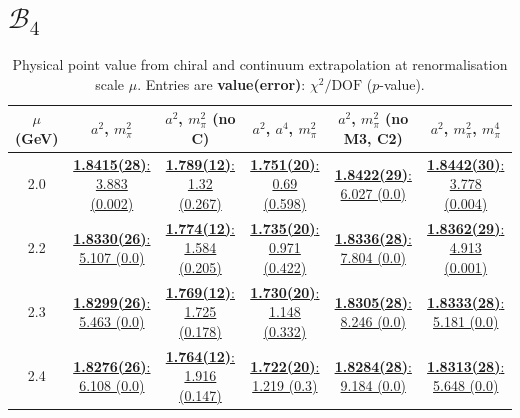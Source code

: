 \documentclass[12pt]{extarticle}
\begin{document}
\section{$\mathcal{B}_4$}
\begin{table}[h!]
\begin{center}
\begin{tabular}{|c|c|c|c|c|c|}
\hline
$\mu$ (GeV) & $a^2$, $m_\pi^2$& $a^2$, $m_\pi^2$ (no C)& $a^2$, $a^4$, $m_\pi^2$& $a^2$, $m_\pi^2$ (no M3, C2)& $a^2$, $m_\pi^2$, $m_\pi^4$\\
\hline
2.0& \hyperlink{SSpPP/SUSY/a2m2_20.pdf.1}{\textbf{1.8415(28)}: 3.883 (0.002)} & \hyperlink{SSpPP/SUSY/a2m2noC_20.pdf.1}{\textbf{1.789(12)}: 1.32 (0.267)} & \hyperlink{SSpPP/SUSY/a2a4m2_20.pdf.1}{\textbf{1.751(20)}: 0.69 (0.598)} & \hyperlink{SSpPP/SUSY/a2m2mcut_20.pdf.1}{\textbf{1.8422(29)}: 6.027 (0.0)} & \hyperlink{SSpPP/SUSY/a2m2m4_20.pdf.1}{\textbf{1.8442(30)}: 3.778 (0.004)}\\
2.2& \hyperlink{SSpPP/SUSY/a2m2_22.pdf.1}{\textbf{1.8330(26)}: 5.107 (0.0)} & \hyperlink{SSpPP/SUSY/a2m2noC_22.pdf.1}{\textbf{1.774(12)}: 1.584 (0.205)} & \hyperlink{SSpPP/SUSY/a2a4m2_22.pdf.1}{\textbf{1.735(20)}: 0.971 (0.422)} & \hyperlink{SSpPP/SUSY/a2m2mcut_22.pdf.1}{\textbf{1.8336(28)}: 7.804 (0.0)} & \hyperlink{SSpPP/SUSY/a2m2m4_22.pdf.1}{\textbf{1.8362(29)}: 4.913 (0.001)}\\
2.3& \hyperlink{SSpPP/SUSY/a2m2_23.pdf.1}{\textbf{1.8299(26)}: 5.463 (0.0)} & \hyperlink{SSpPP/SUSY/a2m2noC_23.pdf.1}{\textbf{1.769(12)}: 1.725 (0.178)} & \hyperlink{SSpPP/SUSY/a2a4m2_23.pdf.1}{\textbf{1.730(20)}: 1.148 (0.332)} & \hyperlink{SSpPP/SUSY/a2m2mcut_23.pdf.1}{\textbf{1.8305(28)}: 8.246 (0.0)} & \hyperlink{SSpPP/SUSY/a2m2m4_23.pdf.1}{\textbf{1.8333(28)}: 5.181 (0.0)}\\
2.4& \hyperlink{SSpPP/SUSY/a2m2_24.pdf.1}{\textbf{1.8276(26)}: 6.108 (0.0)} & \hyperlink{SSpPP/SUSY/a2m2noC_24.pdf.1}{\textbf{1.764(12)}: 1.916 (0.147)} & \hyperlink{SSpPP/SUSY/a2a4m2_24.pdf.1}{\textbf{1.722(20)}: 1.219 (0.3)} & \hyperlink{SSpPP/SUSY/a2m2mcut_24.pdf.1}{\textbf{1.8284(28)}: 9.184 (0.0)} & \hyperlink{SSpPP/SUSY/a2m2m4_24.pdf.1}{\textbf{1.8313(28)}: 5.648 (0.0)}\\
\hline
\end{tabular}
\caption{Physical point value from chiral and continuum extrapolation at renormalisation scale $\mu$. Entries are \textbf{value(error)}: $\chi^2/\text{DOF}$ ($p$-value).}
\end{center}
\end{table}
\end{document}

